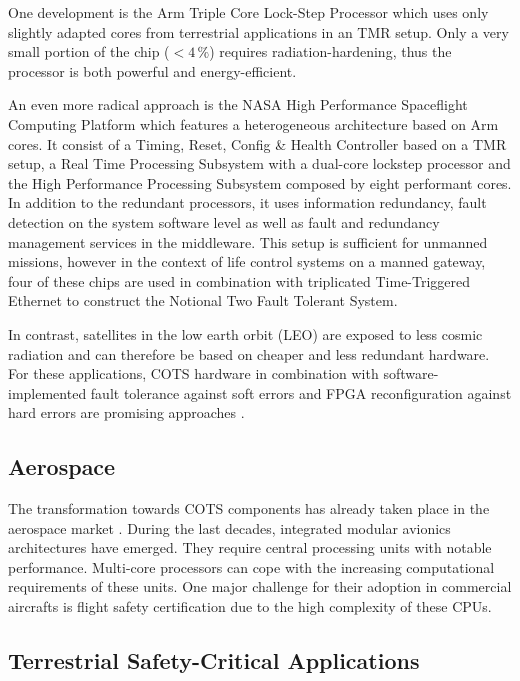 \documentclass[conference]{IEEEtran}
\begin{document}
One development is the Arm Triple Core Lock-Step Processor \cite{Iturbe2019} which uses only slightly adapted cores from terrestrial applications in an TMR setup. Only a very small portion of the chip ($<4\,\%$) requires radiation-hardening, thus the processor is both powerful and energy-efficient.

An even more radical approach is the NASA High Performance Spaceflight Computing Platform \cite{Cudmore2019} which features a heterogeneous architecture based on Arm cores. It consist of a Timing, Reset, Config \& Health Controller based on a TMR setup, a Real Time Processing Subsystem with a dual-core lockstep processor and the High Performance Processing Subsystem composed by eight performant cores. In addition to the redundant processors, it uses information redundancy, fault detection on the system software level as well as fault and redundancy management services in the middleware. This setup is sufficient for unmanned missions, however in the context of life control systems on a manned gateway, four of these chips are used in combination with triplicated Time-Triggered Ethernet to construct the Notional Two Fault Tolerant System.

In contrast, satellites in the low earth orbit (LEO) are exposed to less cosmic radiation and can therefore be based on cheaper and less redundant hardware. For these applications, COTS hardware in combination with software-implemented fault tolerance against soft errors and FPGA reconfiguration against hard errors are promising approaches \cite{Fuchs2018}.

\subsection{Aerospace}

The transformation towards COTS components has already taken place in the aerospace market \cite{Athavale2019}. During the last decades, integrated modular avionics architectures have emerged. They require central processing units with notable performance. Multi-core processors can cope with the increasing computational requirements of these units. One major challenge for their adoption in commercial aircrafts is flight safety certification due to the high complexity of these CPUs.

\subsection{Terrestrial Safety-Critical Applications}
\end{document}
